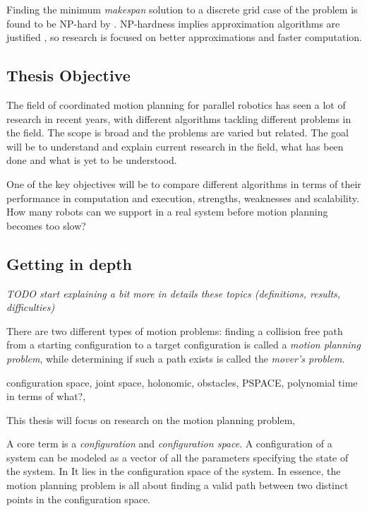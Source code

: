 Finding the minimum \emph{makespan}  solution to a discrete grid case of the problem is found to be NP-hard by \cite{demaineCoordinatedMotionPlanning2019}.
NP-hardness implies approximation algorithms are justified \cite{demaineCoordinatedMotionPlanning2019}, so research is focused on better approximations and faster computation. 

\subsection{Thesis Objective}

The field of coordinated motion planning for parallel robotics has seen a lot of research in recent years, with different algorithms tackling different problems in the field. 
The scope is broad and the problems are varied but related. 
The goal will be  to understand and explain current research in the field, what has been done and what is yet to be understood.

One of the key objectives will be  to compare different algorithms in terms of their performance in computation and execution, strengths, weaknesses and scalability. How many robots can we support in a real system before motion planning becomes too slow? 

\subsection{Getting in depth}

\emph{TODO start explaining a bit more in details these topics (definitions, results, difficulties)}

There are two different types of motion problems: finding a collision free path from a starting configuration to a target configuration is called a \emph{motion planning problem}, while determining if such a path exists is called the \emph{mover's problem}. \cite{hopcroftReducingMultipleObject1986} 

configuration space, joint space, holonomic, obstacles, PSPACE, polynomial time in terms of what?, 

This thesis will focus on research on the motion planning problem, 

A core term is a \emph{configuration} and \emph{configuration space}.  
A configuration of a system can be modeled as a vector of all the parameters specifying the state of the system. 
In  
It lies in the configuration space of the system. 
In essence, the motion planning problem is all about finding a valid path between two distinct points in the configuration space. 

